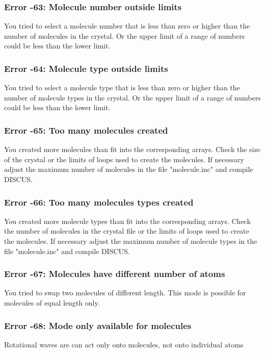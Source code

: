 \subsubsection{Error -63: Molecule number outside limits}
\par
You tried to select a molecule number that is less than zero or higher 
than the number of molecules in the crystal. Or the upper limit of a 
range of numbers could be less than the lower limit. 
\subsubsection{Error -64: Molecule type outside limits}
\par
You tried to select a molecule type that is less than zero or higher 
than the number of molecule types in the crystal. Or the upper limit of a 
range of numbers could be less than the lower limit. 
\subsubsection{Error -65: Too many molecules created}
\par
You created more molecules than fit into the corresponding arrays. 
Check the size of the crystal or the limits of loops used to create 
the molecules. 
If necessary adjust the maximum number of molecules in the file 
"molecule.inc" and compile DISCUS. 
\subsubsection{Error -66: Too many molecules types created}
\par
You created more molecule types than fit into the corresponding arrays. 
Check the number of molecules in the crystal file or the limits of loops 
used to create the molecules. 
If necessary adjust the maximum number of molecule types in the file 
"molecule.inc" and compile DISCUS. 
\subsubsection{Error -67: Molecules have different number of atoms}
\par
You tried to swap two molecules of different length. This mode is 
possible for molecules of equal length only. 
\subsubsection{Error -68: Mode only available for molecules}
\par
Rotational waves are can act only onto molecules, not onto individual 
atoms 
